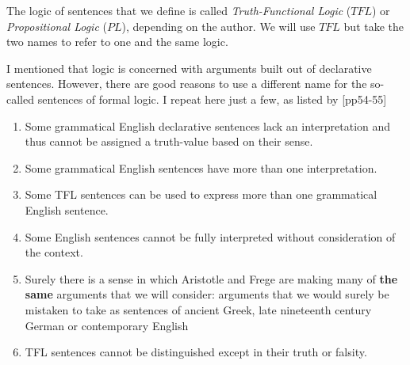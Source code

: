 
The logic of sentences that we define is called \emph{Truth-Functional Logic}
($TFL$) or \emph{Propositional Logic} ($PL$), depending on the author. We will
use $TFL$ but take the two names to refer to one and the same logic.

I mentioned that logic is concerned with arguments built out of declarative
sentences. However, there are good reasons to use a different name for the
so-called sentences of formal logic. I repeat here just a few, as listed by
\cite{Smi20}[pp54-55]

\begin{observation}
  \begin{enumerate}
  \item Some grammatical English declarative sentences lack an interpretation
    and thus cannot be assigned a truth-value based on their sense.
  \item Some grammatical English sentences have more than one interpretation.
  \item Some TFL sentences can be used to express more than one grammatical
    English sentence.
  \item Some English sentences cannot be fully interpreted without consideration
    of the context.
  \item Surely there is a sense in which Aristotle and Frege are making many of
    \textbf{the same} arguments that we will consider: arguments that we would
    surely be mistaken to take as sentences of ancient Greek, late nineteenth
    century German or contemporary English
  \item TFL sentences cannot be distinguished except in their truth or falsity.
  \end{enumerate}
\end{observation}

